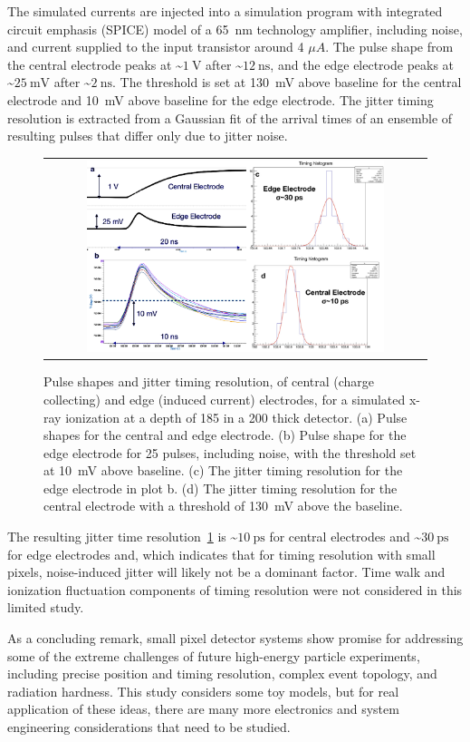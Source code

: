 The simulated currents are injected into a simulation program with integrated circuit emphasis (SPICE) model of a \SI{65}{\nm} technology amplifier, including noise, and current supplied to the input transistor around 4 $\mu A$.
The pulse shape from the central electrode peaks at \sim$\SI{1}{\V}$ after \sim$\SI{12}{\ns}$, and the edge electrode peaks at \sim$\SI{25}{\mV}$ after \sim$\SI{2}{\ns}$.
The threshold is set at \SI{130}{\mV} above baseline for the central electrode and \SI{10}{\mV} above baseline for the edge electrode.
The jitter timing resolution is extracted from a Gaussian fit of the arrival times of an ensemble of resulting pulses that differ only due to jitter noise.
\begin{figure}[!htb]
  \begin{center}
    \begin{tabular}{c}
      \includegraphics[width=0.80\textwidth]{fig_FastTiming/TimingResolutions.png}
    \end{tabular}
    \caption{Pulse shapes and jitter timing resolution, of central (charge collecting) and edge (induced current) electrodes, for a simulated x-ray ionization at a depth of \SI{185}{\micron} in a \SI{200}{\micron} thick detector.
        (a) Pulse shapes for the central and edge electrode. 
        (b) Pulse shape for the edge electrode for 25 pulses, including noise, with the threshold set at \SI{10}{\mV} above baseline.
        (c) The jitter timing resolution for the edge electrode in plot b.
        (d) The jitter timing resolution for the central electrode with a threshold of \SI{130}{\mV} above the baseline.
            }
    \label{TimingResolutions}
  \end{center}
\end{figure}

The resulting jitter time resolution~\ref{TimingResolutions} is \sim$\SI{10}{\ps}$ for central electrodes and \sim$\SI{30}{\ps}$ for edge electrodes and, which indicates that for timing resolution with small pixels, noise-induced jitter will likely not be a dominant factor.
Time walk and ionization fluctuation components of timing resolution were not considered in this limited study.

As a concluding remark, small pixel detector systems show promise for addressing some of the extreme challenges of future high-energy particle experiments, including precise position and timing resolution, complex event topology, and radiation hardness.
This study considers some toy models, but for real application of these ideas, there are many more electronics and system engineering considerations that need to be studied.